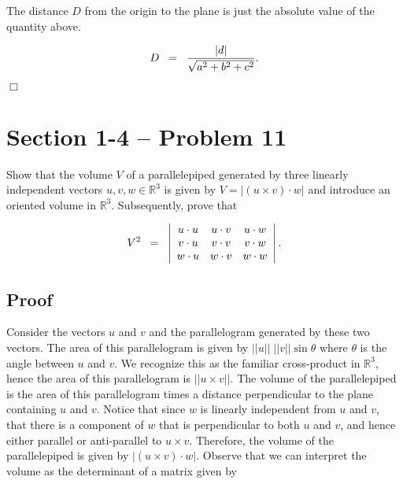 \documentclass{article}
\begin{document}
\noindent The distance $D$ from the origin to the plane is just the absolute value of the quantity above. 

\begin{equation*}
D \;\; = \;\; \frac{|d|}{\sqrt{a^2 + b^2+c^2}}. \\
\end{equation*}

\noindent \hfill $\Box$


\section*{Section 1-4 -- Problem 11}

\noindent Show that the volume $V$ of a parallelepiped generated by three linearly independent vectors $u,v,w \in \mathbb{R}^3$ is given by $V = |(u \times v) \cdot w|$ and introduce an oriented volume in $\mathbb{R}^3$.  Subsequently, prove that

\begin{equation*}
V^2 \;\; = \;\; \left | \begin{array}{ccc}
u \cdot u & u \cdot v & u \cdot w \\
v \cdot u & v\cdot v & v\cdot w \\
w \cdot u & w \cdot v & w\cdot w \\
\end{array} \right |. \\
\end{equation*}

\subsection*{Proof}

\noindent Consider the vectors $u$ and $v$ and the parallelogram generated by these two vectors.  The area of this parallelogram is given by $||u|| \; ||v|| \sin \theta$ where $\theta$ is the angle between $u$ and $v$.  We recognize this as the familiar cross-product in $\mathbb{R}^3$, hence the area of this parallelogram is $||u \times v||$.  The volume of the parallelepiped is the area of this parallelogram times a distance perpendicular to the plane containing $u$ and $v$.  Notice that since $w$ is linearly independent from $u$ and $v$, that there is a component of $w$ that is perpendicular to both $u$ and $v$, and hence either parallel or anti-parallel to $u \times v$.  Therefore, the volume of the parallelepiped is given by $|(u \times v) \cdot w|$.  Observe that we can interpret the volume as the determinant of a matrix given by 
\end{document}

